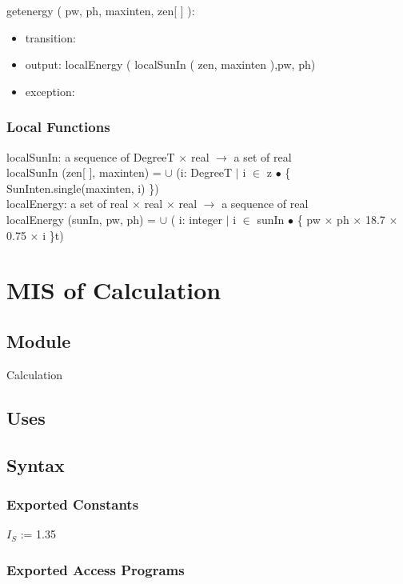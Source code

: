 \documentclass[12pt, titlepage]{article}
\begin{document}
\noindent  getenergy ( pw, ph, maxinten, zen[ ] ):
\begin{itemize}
\item transition:
\item output:  localEnergy ( localSunIn ( zen, maxinten ),pw, ph)
\item exception: 
\end{itemize}


\subsubsection{Local Functions}
localSunIn: a sequence of DegreeT $\times$ real $\rightarrow$ a set of real\\
localSunIn (zen[ ], maxinten) = $\cup$ (i: DegreeT $|$ i $\in$ z $\bullet$ \{ SunInten.single(maxinten, i) \})\\

localEnergy: a set of real $\times$ real $\times$ real $\rightarrow$ a sequence of real\\
localEnergy (sunIn, pw, ph) =  $\cup$ ( i: integer $|$ i $\in$ sunIn $\bullet$ \{ pw $\times$ ph $\times$ 18.7 $\times$ 0.75 $\times$ i \}t)



\newpage


\section{MIS of Calculation} \label{ModuleC} 

\subsection{Module}
Calculation\\


\subsection{Uses}


\subsection{Syntax}

\subsubsection{Exported Constants}
$I_{S}$ := 1.35\\

\subsubsection{Exported Access Programs}
\end{document}
